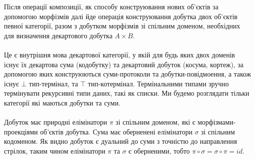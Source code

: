     Після операції композиції, як способу конструювання нових об’єктів
    за допомогою морфізмів далі йде операція конструювання добутка двох об’єктів певної категорії,
    разом з добутком морфізмів зі спільним доменом, необхідних для визначення декартового добутка $A \times B$.

    \paragraph{}
    Це є внутрішня мова декартової категорії, у якій для будь яких двох доменів існує їх декартова сума (кодобутку)
    та декартовий добуток (косума, кортеж), за допомогою яких конструюються суми-протоколи та добутки-повідмоення,
    а також існує $\bot$ тип-термінал, та $\top$ тип-котермінал. Термінальними типами зручно термінувати рекурсивні
    типи даних, такі як списки. Ми будемо розглядати тільки категорії які маються добутки та суми.

    \paragraph{}
    Добуток має природні елімінатори $\pi$ зі спільним доменом, які є морфізмами-проекціями об’єктів добутка. Сума має оберненені
    елімінатори $\sigma$ зі спільним кодоменом. Як видно добуток є дуальний до суми з точністю до направлення стрілок,
    таким чином елімінатори $\pi$ та $\sigma$ є оберненими, тобто $\pi \circ \sigma = \sigma \circ \pi = id$.

